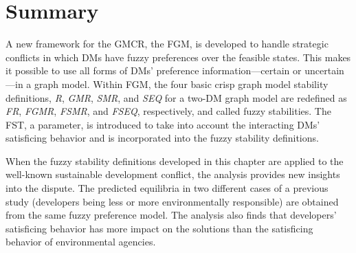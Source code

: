 \section{Summary}

A new framework for the GMCR, the FGM, is developed to handle strategic conflicts in which DMs have fuzzy preferences over the feasible states. This makes it possible to use all forms of DMs' preference information---certain or uncertain---in a graph model. Within FGM, the four basic crisp graph model stability definitions, \emph{R}, \emph{GMR}, \emph{SMR}, and \emph{SEQ} for a two-DM graph model are redefined as \emph{FR}, \emph{FGMR}, \emph{FSMR}, and \emph{FSEQ}, respectively, and called fuzzy stabilities. The FST, a parameter, is introduced to take into account the interacting DMs' satisficing behavior and is incorporated into the fuzzy stability definitions.

When the fuzzy stability definitions developed in this chapter are applied to the well-known sustainable development conflict, the analysis provides new insights into the dispute. The predicted equilibria in two different cases of a previous study (developers being less or more environmentally responsible) are obtained from the same fuzzy preference model. The analysis also finds that developers' satisficing behavior has more impact on the solutions than the satisficing behavior of environmental agencies.




%
%
%

